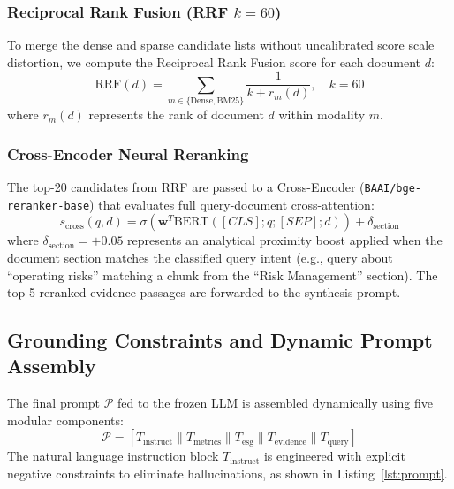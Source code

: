 \documentclass[conference]{IEEEtran}
\begin{document}
\subsubsection{Reciprocal Rank Fusion (RRF $k=60$)}
To merge the dense and sparse candidate lists without uncalibrated score scale distortion, we compute the Reciprocal Rank Fusion score for each document $d$:
\begin{equation}
\text{RRF}(d) = \sum_{m \in \{\text{Dense}, \text{BM25}\}} \frac{1}{k + r_m(d)}, \quad k = 60
\end{equation}
where $r_m(d)$ represents the rank of document $d$ within modality $m$.

\subsubsection{Cross-Encoder Neural Reranking}
The top-20 candidates from RRF are passed to a Cross-Encoder (\texttt{BAAI/bge-reranker-base}) that evaluates full query-document cross-attention:
\begin{equation}
s_{\text{cross}}(q, d) = \sigma\left(\mathbf{w}^T \text{BERT}([CLS]; q; [SEP]; d)\right) + \delta_{\text{section}}
\end{equation}
where $\delta_{\text{section}} = +0.05$ represents an analytical proximity boost applied when the document section matches the classified query intent (e.g., query about ``operating risks'' matching a chunk from the ``Risk Management'' section). The top-5 reranked evidence passages are forwarded to the synthesis prompt.

\subsection{Grounding Constraints and Dynamic Prompt Assembly}
The final prompt $\mathcal{P}$ fed to the frozen LLM is assembled dynamically using five modular components:
\begin{equation}
\mathcal{P} = \left[ T_{\text{instruct}} \parallel T_{\text{metrics}} \parallel T_{\text{esg}} \parallel T_{\text{evidence}} \parallel T_{\text{query}} \right]
\end{equation}
The natural language instruction block $T_{\text{instruct}}$ is engineered with explicit negative constraints to eliminate hallucinations, as shown in Listing~\ref{lst:prompt}.
\end{document}
